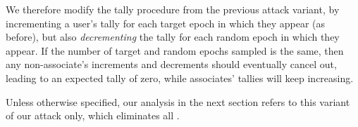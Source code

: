 We therefore modify the tally procedure from the previous attack
variant, by incrementing a user's tally for each target epoch in which
they appear (as before), but also \emph{decrementing} the tally for each
random epoch in which they appear. If the number of target and random
epochs sampled is the same, then any non-associate's increments and
decrements should eventually cancel out, leading to an expected tally of
zero, while associates' tallies will keep increasing.

Unless otherwise specified, our analysis in the next section refers to
this variant of our attack only, which eliminates
all .

% 





\fi


